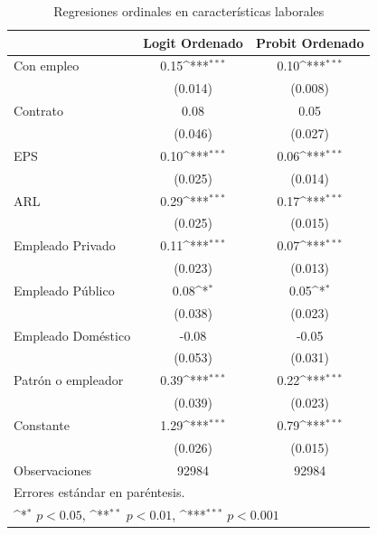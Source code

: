 \documentclass[12pt,spanish]{article}
\begin{document}
\begin{table}[H]
    \caption{Regresiones ordinales en características laborales}
    \centering
{
\def\sym#1{\ifmmode^{#1}\else\(^{#1}\)\fi}
\begin{tabular}{l*{2}{c}}
\hline\hline
&\multicolumn{1}{c}{Logit Ordenado}&\multicolumn{1}{c}{Probit Ordenado}\\
\hline
Con empleo     &        0.15\sym{***}&        0.10\sym{***}\\
            &     (0.014)         &     (0.008)         \\
[1em]
Contrato    &        0.08         &        0.05         \\
            &     (0.046)         &     (0.027)         \\
[1em]
EPS         &        0.10\sym{***}&        0.06\sym{***}\\
            &     (0.025)         &     (0.014)         \\
[1em]
ARL         &        0.29\sym{***}&        0.17\sym{***}\\
            &     (0.025)         &     (0.015)         \\
[1em]
Empleado Privado&        0.11\sym{***}&        0.07\sym{***}\\
            &     (0.023)         &     (0.013)         \\
[1em]
Empleado Público &        0.08\sym{*}  &        0.05\sym{*}  \\
            &     (0.038)         &     (0.023)         \\
[1em]
Empleado Doméstico &       -0.08         &       -0.05         \\
            &     (0.053)         &     (0.031)         \\
[1em]
Patrón o empleador     &        0.39\sym{***}&        0.22\sym{***}\\
            &     (0.039)         &     (0.023)         \\
Constante      &        1.29\sym{***}&        0.79\sym{***}\\
            &     (0.026)         &     (0.015)         \\
\hline
Observaciones       &       92984         &       92984         \\
\hline\hline
        \multicolumn{12}{l}{\footnotesize Errores estándar en paréntesis.}\\
        \multicolumn{12}{l}{\footnotesize \sym{*} \(p<0.05\), \sym{**} \(p<0.01\), \sym{***} \(p<0.001\)}\\
\end{tabular}
}

\label{tab:tab7}
\end{table}
\end{document}

